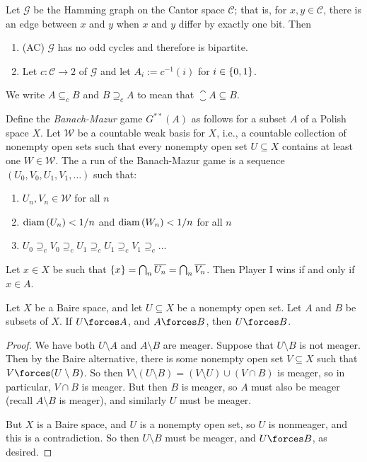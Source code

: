 \documentclass[10pt]{article}
\begin{document}
\begin{proposition}[Exercise 42]
    Let $\mathcal{G}$ be the Hamming graph on the Cantor space $\mathcal{C}$; that is, for $x,y \in \mathcal{C}$, there is an edge between $x$ and $y$ when $x$ and $y$ differ by exactly one bit.
    Then
    \begin{enumerate}
        \item (AC) $\mathcal{G}$ has no odd cycles and therefore is bipartite.
        \item Let $c : \mathcal{C} \to 2$ of $\mathcal{G}$ and let $A_i := c^{-1}(i)$ for $i \in {\left\{ {0,1} \right\}}$.
    \end{enumerate}
\end{proposition}

We write $A \subseteq_c B$ and $B \supseteq_c A$ to mean that $\closure{A} \subseteq B$.

Define the \emph{Banach-Mazur} game $G^{**}(A)$ as follows for a subset $A$ of a Polish space $X$.
Let $\mathcal{W}$ be a countable weak basis for $X$, i.e., a countable collection of nonempty open sets such that every nonempty open set $U \subseteq X$ contains at least one $W \in \mathcal{W}$.
The a run of the Banach-Mazur game is a sequence $(U_0, V_0, U_1, V_1, \ldots)$ such that:
\begin{enumerate}[label=(\roman*)]
    \item $U_n, V_n \in \mathcal{W}$ for all $n$
    \item $\text{diam} \left( U_n \right) < 1/n$ and $\text{diam} \left( W_n \right) < 1/n$ for all $n$
    \item $U_0 \supseteq_c V_0 \supseteq_c U_1 \supseteq_c U_1 \supseteq_c V_1 \supseteq_c \ldots$
\end{enumerate}
Let $x \in X$ be such that ${\left\{ {x} \right\}} = \bigcap_n \overline{U_n} = \bigcap_n \overline{V_n}$.
Then Player I wins if and only if $x \in A$.

\begin{proposition}\label{prop:forces-baire-meas}
    Let $X$ be a Baire space, and let $U \subseteq X$ be a nonempty open set.
    Let $A$ and $B$ be subsets of $X$.
    If $U \forces A$, and $A \forces B$, then $U \forces B$.
\end{proposition}
\begin{proof}
    We have both $U \setminus A$ and $A \setminus B$ are meager.
    Suppose that $U \setminus B$ is not meager.
    Then by the Baire alternative, there is some nonempty open set $V \subseteq X$ such that $V \forces (U \setminus B)$.
    So then $V \setminus (U \setminus B) = (V \setminus U) \cup (V \cap B)$ is meager, so in particular, $V \cap B$ is meager.
    But then $B$ is meager, so $A$ must also be meager (recall $A \setminus B$ is meager), and similarly $U$ must be meager.

    But $X$ is a Baire space, and $U$ is a nonempty open set, so $U$ is nonmeager, and this is a contradiction.
    So then $U \setminus B$ must be meager, and $U \forces B$, as desired.
\end{proof}
\end{document}
